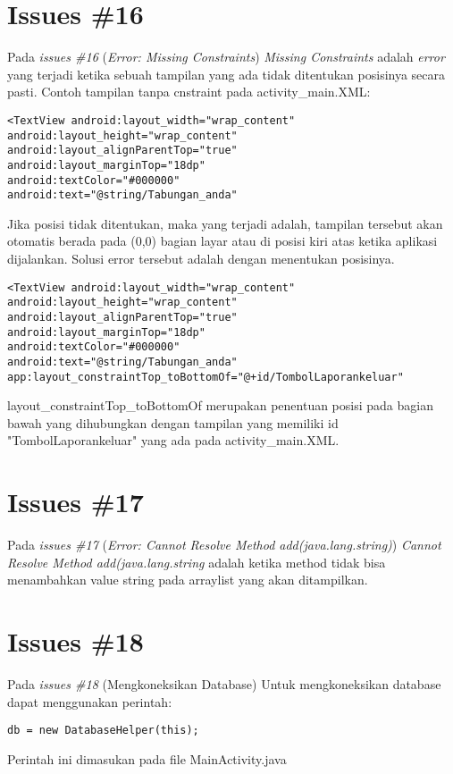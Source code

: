 \section{Issues \#16}
Pada \textit{issues \#16} (\textit{Error: Missing Constraints}) \textit{Missing Constraints} adalah \textit{error} yang terjadi ketika sebuah tampilan yang ada tidak ditentukan posisinya secara pasti. Contoh tampilan tanpa cnstraint pada activity\_main.XML: 
\begin{verbatim}
<TextView android:layout_width="wrap_content"
android:layout_height="wrap_content"
android:layout_alignParentTop="true"
android:layout_marginTop="18dp"
android:textColor="#000000"
android:text="@string/Tabungan_anda" 
\end{verbatim}
Jika posisi tidak ditentukan, maka yang terjadi adalah, tampilan tersebut akan otomatis berada pada (0,0) bagian layar atau di posisi kiri atas ketika aplikasi dijalankan. Solusi error tersebut adalah dengan menentukan posisinya. 
\begin{verbatim}
<TextView android:layout_width="wrap_content"
android:layout_height="wrap_content"
android:layout_alignParentTop="true"
android:layout_marginTop="18dp"
android:textColor="#000000"
android:text="@string/Tabungan_anda"
app:layout_constraintTop_toBottomOf="@+id/TombolLaporankeluar"
\end{verbatim}
layout\_constraintTop\_toBottomOf merupakan penentuan posisi pada bagian bawah yang dihubungkan dengan tampilan yang memiliki id "TombolLaporankeluar" yang ada pada activity\_main.XML.


\section{Issues \#17}
Pada \textit{issues \#17} (\textit{Error: Cannot Resolve Method add(java.lang.string)}) \textit{Cannot Resolve Method add(java.lang.string} adalah ketika method tidak bisa menambahkan value string pada arraylist yang akan ditampilkan. 

\section{Issues \#18}
Pada \textit{issues \#18} (Mengkoneksikan Database) Untuk mengkoneksikan database dapat menggunakan perintah:
\begin{verbatim}
db = new DatabaseHelper(this); 
\end{verbatim}
Perintah ini dimasukan pada file MainActivity.java

